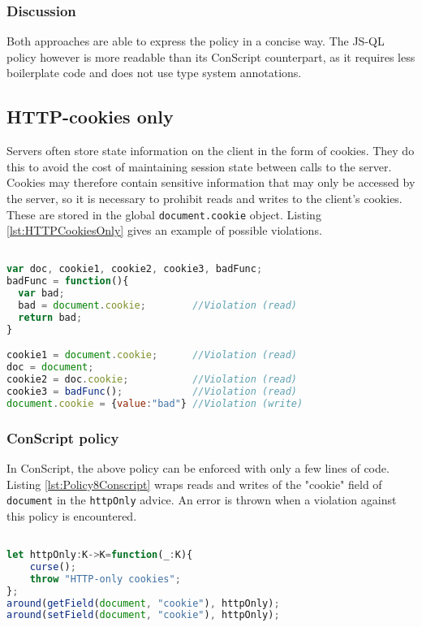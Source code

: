 \subsubsection*{Discussion}
Both approaches are able to express the policy in a concise way. The JS-QL policy however is more readable than its ConScript counterpart, as it requires less boilerplate code and does not use type system annotations.

\subsection{HTTP-cookies only}
\label{subsec:HTTPOnly}


Servers often store state information on the client in the form of cookies. They do this to avoid the cost of maintaining session state between calls to the server. Cookies may therefore contain sensitive information that may only be accessed by the server, so it is necessary to prohibit reads and writes to the client's cookies. These are stored in the global \texttt{document.cookie} object. Listing \ref{lst:HTTPCookiesOnly} gives an example of possible violations.

\begin{lstlisting}[label={lst:HTTPCookiesOnly},language=JavaScript,caption=HTTP-cookies only example,mathescape=true]  % float=t?

var doc, cookie1, cookie2, cookie3, badFunc;
badFunc = function(){
  var bad;
  bad = document.cookie;        //Violation (read)
  return bad;
}

cookie1 = document.cookie;      //Violation (read)
doc = document;
cookie2 = doc.cookie;           //Violation (read)
cookie3 = badFunc();            //Violation (read)
document.cookie = {value:"bad"} //Violation (write)
\end{lstlisting}


\subsubsection*{ConScript policy}

In ConScript, the above policy can be enforced with only a few lines of code. Listing \ref{lst:Policy8Conscript} wraps reads and writes of the "cookie" field of \texttt{document} in the \texttt{httpOnly} advice. An error is thrown when a violation against this policy is encountered.

\begin{lstlisting}[label={lst:Policy8Conscript},language=JavaScript,caption=Policy 8 in ConScript,mathescape=true]  % float=t?

let httpOnly:K->K=function(_:K){ 
    curse(); 
    throw "HTTP-only cookies"; 
};
around(getField(document, "cookie"), httpOnly); 
around(setField(document, "cookie"), httpOnly);
\end{lstlisting}


